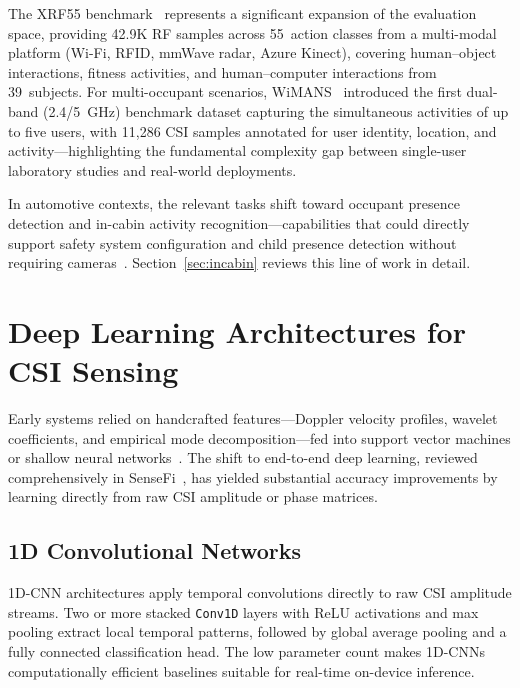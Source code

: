\documentclass[english,bibtex]{kththesis}
\begin{document}
%
The XRF55 benchmark~\cite{wang2024xrf55} represents a significant expansion of the evaluation space, providing 42.9K RF samples across 55~action classes from a multi-modal platform (Wi-Fi, RFID, mmWave radar, Azure Kinect), covering human--object interactions, fitness activities, and human--computer interactions from 39~subjects. For multi-occupant scenarios, WiMANS~\cite{huang2024wimans} introduced the first dual-band (2.4/5~GHz) benchmark dataset capturing the simultaneous activities of up to five users, with 11{,}286 CSI samples annotated for user identity, location, and activity---highlighting the fundamental complexity gap between single-user laboratory studies and real-world deployments.

In automotive contexts, the relevant tasks shift toward occupant presence detection and in-cabin activity recognition---capabilities that could directly support safety system configuration and child presence detection without requiring cameras~\cite{markert2025wise4car,bai2019widrive,bai2020carin,jia2020wifind,jayaweera2025deepcpd}. Section~\ref{sec:incabin} reviews this line of work in detail.

\section{Deep Learning Architectures for CSI Sensing}
\label{sec:models}

Early systems relied on handcrafted features---Doppler velocity profiles, wavelet coefficients, and empirical mode decomposition---fed into support vector machines or shallow neural networks~\cite{wang2014e}. The shift to end-to-end deep learning, reviewed comprehensively in SenseFi~\cite{yang2023sensefi}, has yielded substantial accuracy improvements by learning directly from raw CSI amplitude or phase matrices.

\subsection{1D Convolutional Networks}
\label{sec:models-1dcnn}

%
1D-CNN architectures apply temporal convolutions directly to raw CSI amplitude streams. Two or more stacked \texttt{Conv1D} layers with ReLU activations and max pooling extract local temporal patterns, followed by global average pooling and a fully connected classification head. The low parameter count makes 1D-CNNs computationally efficient baselines suitable for real-time on-device inference.
\end{document}
